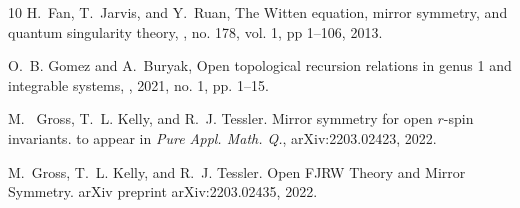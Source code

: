 \documentclass[11pt]{amsart}
\theoremstyle{definition}
\theoremstyle{remark}
\newcommand{\<}{\left<}
\renewcommand{\>}{\right>}
\numberwithin{equation}{section}
\begin{document}
\begin{thebibliography}{10}
H.~Fan, T.~Jarvis, and %
Y.~Ruan,
\newblock The {W}itten equation, mirror symmetry, and quantum singularity
  theory,
, no. 178, vol. 1, pp 1--106, 2013.

O.~B. Gomez and A.~Buryak,
\newblock Open topological recursion relations in genus 1 and integrable
  systems,
, 2021, no. 1, pp. 1--15.

M.%
~Gross, T.~L. Kelly, and R.~J. Tessler.
\newblock Mirror symmetry for open $r$-spin invariants.
\newblock to appear in \textit{Pure Appl. Math. Q.}, arXiv:2203.02423, 2022.

M.~Gross, T.~L. Kelly, and R.~J. Tessler.
\newblock Open {FJRW} {T}heory and {M}irror {S}ymmetry.
\newblock arXiv preprint arXiv:2203.02435, 2022.


\end{thebibliography}
\end{document}
